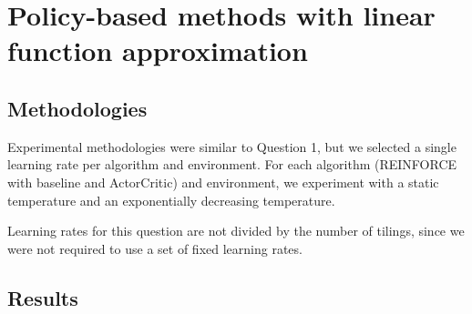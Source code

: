 \documentclass{article}
\begin{document}
\section{Policy-based methods with linear function approximation}




\subsection{Methodologies}




Experimental methodologies were similar to Question 1, but we selected a single learning rate per
algorithm and environment. For each algorithm (REINFORCE with baseline and ActorCritic) and environment, we experiment with a static temperature and an
exponentially decreasing temperature.




Learning rates for this question are not divided by the number of tilings, since we were not
required to use a set of fixed learning rates.




\subsection{Results}
\end{document}
